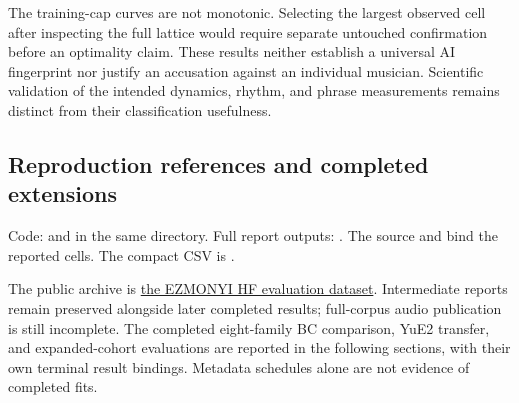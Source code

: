The training-cap curves are not monotonic. Selecting the largest observed cell after inspecting the full lattice would require separate untouched confirmation before an optimality claim. These results neither establish a universal AI fingerprint nor justify an accusation against an individual musician. Scientific validation of the intended dynamics, rhythm, and phrase measurements remains distinct from their classification usefulness.

\subsection{Reproduction references and completed extensions}

Code:  and  in the same directory. Full report outputs: . The source  and  bind the reported cells. The compact CSV is .

The public archive is \href{https://huggingface.co/datasets/EZMONYI/music-ai-human-test-audio}{the EZMONYI HF evaluation dataset}. Intermediate reports remain preserved alongside later completed results; full-corpus audio publication is still incomplete. The completed eight-family BC comparison, YuE2 transfer, and expanded-cohort evaluations are reported in the following sections, with their own terminal result bindings. Metadata schedules alone are not evidence of completed fits.
